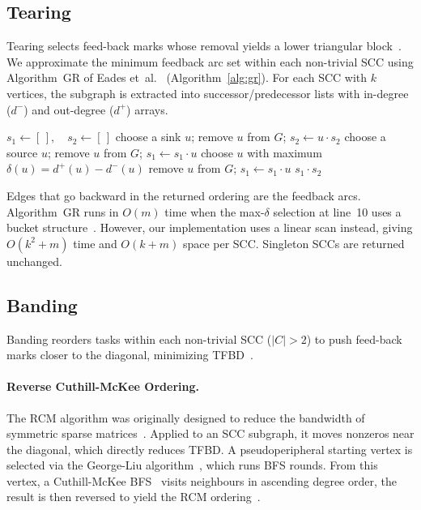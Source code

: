 \documentclass[12pt]{article}
\theoremstyle{definition}
\begin{document}
\subsection{Tearing}\label{sec:tearing}
\enlargethispage{\baselineskip}

Tearing selects feed-back marks whose removal yields a lower triangular block~\cite{Yassine2001AnIT}. We approximate the minimum feedback arc set within each non-trivial SCC using Algorithm~GR of Eades et~al.~\cite{eades1993fast} (Algorithm~\ref{alg:gr}). For each SCC with $k$ vertices, the subgraph is extracted into successor/predecessor lists with in-degree ($d^-$) and out-degree ($d^+$) arrays.

\begin{algorithm}[H]
	\caption{Algorithm GR~\cite{eades1993fast}}\label{alg:gr}
	\begin{algorithmic}[1]
		\State $s_1 \gets [\,],\quad s_2 \gets [\,]$
		\State choose a sink $u$; remove $u$ from $G$; $s_2 \gets u \cdot s_2$
		\EndWhile
		\State choose a source $u$; remove $u$ from $G$; $s_1 \gets s_1 \cdot u$
		\EndWhile
		\State choose $u$ with maximum $\delta(u) = d^+(u) - d^-(u)$
		\State remove $u$ from $G$; $s_1 \gets s_1 \cdot u$
		\EndIf
		\EndWhile
		\State \Return $s_1 \cdot s_2$
	\end{algorithmic}
\end{algorithm}

\noindent Edges that go backward in the returned ordering are the feedback arcs. Algorithm~GR runs in $O(m)$ time when the max-$\delta$ selection at line~10 uses a bucket structure~\cite{eades1993fast}. However, our implementation uses a linear scan instead, giving $O(k^2 + m)$ time and $O(k + m)$ space per SCC. Singleton SCCs are returned unchanged.

\subsection{Banding}
\enlargethispage{\baselineskip}

Banding reorders tasks within each non-trivial SCC ($|C| > 2$) to push feed-back marks closer to the diagonal, minimizing TFBD~\cite{hossain_addendum}.

\paragraph{Reverse Cuthill-McKee Ordering.}
The RCM algorithm was originally designed to reduce the bandwidth of symmetric sparse matrices~\cite{cuthill1969reducing}. Applied to an SCC subgraph, it moves nonzeros near the diagonal, which directly reduces TFBD. A pseudoperipheral starting vertex is selected via the George-Liu algorithm~\cite{georgeliu1979}, which runs BFS rounds. From this vertex, a Cuthill-McKee BFS~\cite{cuthill1969reducing} visits neighbours in ascending degree order, the result is then reversed to yield the RCM ordering~\cite{george1971computer}.
\end{document}
